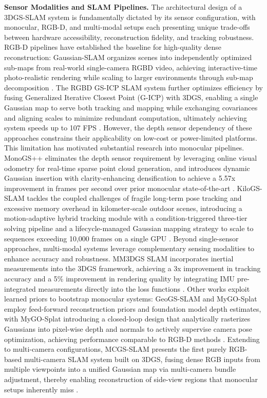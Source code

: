 \documentclass[11pt]{article}
\begin{document}
\textbf{Sensor Modalities and SLAM Pipelines.} The architectural design of a 3DGS-SLAM system is fundamentally dictated by its sensor configuration, with monocular, RGB-D, and multi-modal setups each presenting unique trade-offs between hardware accessibility, reconstruction fidelity, and tracking robustness. RGB-D pipelines have established the baseline for high-quality dense reconstruction: Gaussian-SLAM organizes scenes into independently optimized sub-maps from real-world single-camera RGBD video, achieving interactive-time photo-realistic rendering while scaling to larger environments through sub-map decomposition \cite{ref632}. The RGBD GS-ICP SLAM system further optimizes efficiency by fusing Generalized Iterative Closest Point (G-ICP) with 3DGS, enabling a single Gaussian map to serve both tracking and mapping while exchanging covariances and aligning scales to minimize redundant computation, ultimately achieving system speeds up to 107 FPS \cite{ref633}. However, the depth sensor dependency of these approaches constrains their applicability on low-cost or power-limited platforms. This limitation has motivated substantial research into monocular pipelines. MonoGS++ eliminates the depth sensor requirement by leveraging online visual odometry for real-time sparse point cloud generation, and introduces dynamic Gaussian insertion with clarity-enhancing densification to achieve a 5.57x improvement in frames per second over prior monocular state-of-the-art \cite{ref634}. KiloGS-SLAM tackles the coupled challenges of fragile long-term pose tracking and excessive memory overhead in kilometer-scale outdoor scenes, introducing a motion-adaptive hybrid tracking module with a condition-triggered three-tier solving pipeline and a lifecycle-managed Gaussian mapping strategy to scale to sequences exceeding 10,000 frames on a single GPU \cite{ref635}. Beyond single-sensor approaches, multi-modal systems leverage complementary sensing modalities to enhance accuracy and robustness. MM3DGS SLAM incorporates inertial measurements into the 3DGS framework, achieving a 3x improvement in tracking accuracy and a 5\% improvement in rendering quality by integrating IMU pre-integrated measurements directly into the loss functions \cite{ref636}. Other works exploit learned priors to bootstrap monocular systems: GeoGS-SLAM and MyGO-Splat employ feed-forward reconstruction priors and foundation model depth estimates, with MyGO-Splat introducing a closed-loop design that analytically rasterizes Gaussians into pixel-wise depth and normals to actively supervise camera pose optimization, achieving performance comparable to RGB-D methods \cite{ref243,ref637}. Extending to multi-camera configurations, MCGS-SLAM presents the first purely RGB-based multi-camera SLAM system built on 3DGS, fusing dense RGB inputs from multiple viewpoints into a unified Gaussian map via multi-camera bundle adjustment, thereby enabling reconstruction of side-view regions that monocular setups inherently miss \cite{ref247}.
\end{document}
